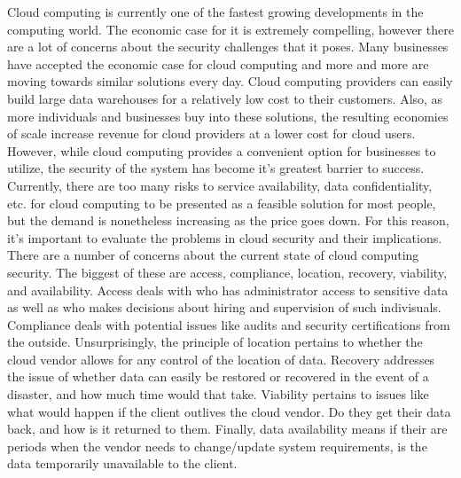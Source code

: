 \documentclass[a4paper, 8pt]{article} %
\begin{document}
Cloud computing is currently one of the fastest growing developments in the computing world.  The economic case for it is extremely compelling, however there are a lot of concerns about the security challenges that it poses.  Many businesses have accepted the economic case for cloud computing and more and more are moving towards similar solutions every day.  Cloud computing providers can easily build large data warehouses for a relatively low cost to their customers.  Also, as more individuals and businesses buy into these solutions, the resulting economies of scale increase revenue for cloud providers at a lower cost for cloud users.  However, while cloud computing provides a convenient option for businesses to utilize, the security of the system has become it's greatest barrier to success.  Currently, there are too many risks to service availability, data confidentiality, etc. for cloud computing to be presented as a feasible solution for most people, but the demand is nonetheless increasing as the price goes down.  For this reason, it's important to evaluate the problems in cloud security and their implications.  There are a number of concerns about the current state of cloud computing security.  The biggest of these are access, compliance, location, recovery, viability, and availability.  Access deals with who has administrator access to sensitive data as well as who makes decisions about hiring and supervision of such indivisuals.  Compliance deals with potential issues like audits and security certifications from the outside.  Unsurprisingly, the principle of location pertains to whether the cloud vendor allows for any control of the location of data.  Recovery addresses the issue of whether data can easily be restored or recovered in the event of a disaster, and how much time would that take.  Viability pertains to issues like what would happen if the client outlives the cloud vendor.  Do they get their data back, and how is it returned to them.  Finally, data availability means if their are periods when the vendor needs to change/update system requirements, is the data temporarily unavailable to the client.  
\end{document}
